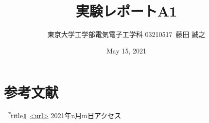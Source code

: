 \documentclass[a4j,dvipdfmx]{article}
\title{実験レポートA1}
\author{東京大学工学部電気電子工学科 03210517\ 藤田 誠之 }
\date{May 15, 2021}
\begin{document}
\maketitle

\section{}

\section{参考文献}
『title』\url{<url>} 2021年n月m日アクセス
\end{document}
